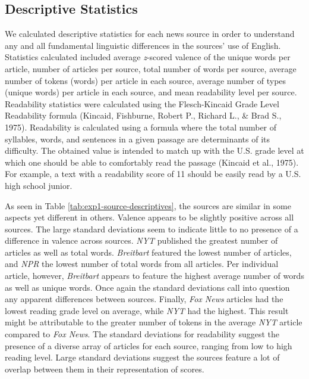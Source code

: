 \documentclass[
  man,floatsintext]{apa6}
\begin{document}
\hypertarget{descriptive-statistics}{%
\subsection{Descriptive Statistics}\label{descriptive-statistics}}

We calculated descriptive statistics for each news source in order to understand any and all fundamental linguistic differences in the sources' use of English. Statistics calculated included average \emph{z}-scored valence of the unique words per article, number of articles per source, total number of words per source, average number of tokens (words) per article in each source, average number of types (unique words) per article in each source, and mean readability level per source. Readability statistics were calculated using the Flesch-Kincaid Grade Level Readability formula (Kincaid, Fishburne, Robert P., Richard L., \& Brad S., 1975). Readability is calculated using a formula where the total number of syllables, words, and sentences in a given passage are determinants of its difficulty. The obtained value is intended to match up with the U.S. grade level at which one should be able to comfortably read the passage (Kincaid et al., 1975). For example, a text with a readability score of 11 should be easily read by a U.S. high school junior.

As seen in Table \ref{tab:exp1-source-descriptives}, the sources are similar in some aspects yet different in others. Valence appears to be slightly positive across all sources. The large standard deviations seem to indicate little to no presence of a difference in valence across sources. \emph{NYT} published the greatest number of articles as well as total words. \emph{Breitbart} featured the lowest number of articles, and \emph{NPR} the lowest number of total words from all articles. Per individual article, however, \emph{Breitbart} appears to feature the highest average number of words as well as unique words. Once again the standard deviations call into question any apparent differences between sources. Finally, \emph{Fox News} articles had the lowest reading grade level on average, while \emph{NYT} had the highest. This result might be attributable to the greater number of tokens in the average \emph{NYT} article compared to \emph{Fox News}. The standard deviations for readability suggest the presence of a diverse array of articles for each source, ranging from low to high reading level. Large standard deviations suggest the sources feature a lot of overlap between them in their representation of scores.
\end{document}

